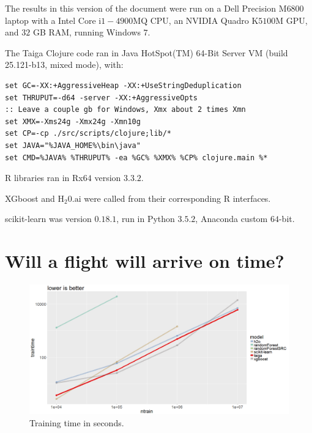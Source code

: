 \documentclass[11pt,american,usenames,dvipsnames,svgnames,x11names,table]{article}
\begin{document}
The results in this version of the document were run on a
Dell Precision $\mathrm{M}6800$ laptop with a Intel Core
$\mathrm{i}1-4900\mathrm{MQ}$ CPU, an NVIDIA Quadro
$\mathrm{K}5100\mathrm{M}$ GPU, and $32$ GB RAM,
running Windows $7$.

The Taiga Clojure code ran in Java HotSpot(TM) 64-Bit Server VM (build
25.121-b13, mixed mode), with:
\begin{verbatim}
set GC=-XX:+AggressiveHeap -XX:+UseStringDeduplication 
set THRUPUT=-d64 -server -XX:+AggressiveOpts 
:: Leave a couple gb for Windows, Xmx about 2 times Xmn
set XMX=-Xms24g -Xmx24g -Xmn10g 
set CP=-cp ./src/scripts/clojure;lib/*
set JAVA="%JAVA_HOME%\bin\java"
set CMD=%JAVA% %THRUPUT% -ea %GC% %XMX% %CP% clojure.main %*
\end{verbatim}

R libraries ran in Rx$64$ version $3.3.2$. 

XGboost and $\mathrm{H_{2}0.ai}$ were called from their corresponding R
interfaces.

scikit-learn was version $0.18.1$, run in Python $3.5.2$, Anaconda
custom $64$-bit.




\section{\label{sec:ontime}Will a flight will arrive on time?}

\begin{figure}[H]
\noindent \begin{centering}
\includegraphics[width=16cm]{ontime/traintime.png}
\par\end{centering}
\protect\caption{\label{fig:ontime-traintime}Training time in seconds.}
\end{figure}
\end{document}
